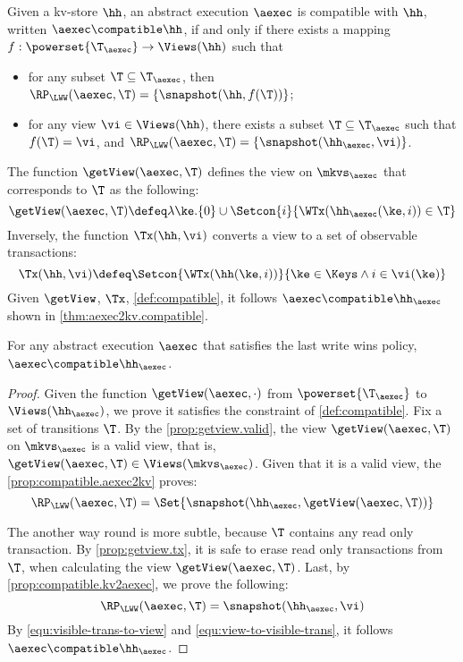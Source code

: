 \begin{definition}
\label{def:compatible}
Given a kv-store $\hh$,
an abstract execution $\aexec$ is compatible with $\hh$, written 
$\aexec \compatible \hh$, if and only if there exists a  mapping 
$f: \powerset{\T_{\aexec}} \rightarrow \Views(\hh)$
such that  
\begin{itemize}
\item for any subset $\T \subseteq \T_{\aexec}$, then $\RP_{\LWW}(\aexec, \T) = \{\snapshot(\hh, f(\T))\}$; 
\item for any view $\vi \in \Views(\hh)$, there exists a subset $\T \subseteq \T_{\aexec}$ 
such that $f(\T) = \vi$, and $\RP_{\LWW}(\aexec, \T) = \{\snapshot(\hh_{\aexec}, \vi)\}$.
\end{itemize}
\end{definition}

The function $\getView(\aexec, \T)$ defines the view on \( \mkvs_\aexec \) that corresponds to \( \T \) as the following:
\[
    \getView(\aexec, \T) \defeq \lambda \ke. \{0\} \cup \Setcon{ i }{\WTx(\hh_{\aexec}(\ke, i)) \in \T}
\]
Inversely, the function \( \Tx(\hh, \vi) \) converts a view to a set of observable transactions:
\[
\Tx(\hh, \vi) \defeq \Setcon{ \WTx(\hh(\ke, i)) }{ \ke \in \Keys \wedge i \in \vi(\ke) }
\]
Given \( \getView \), \( \Tx \), \cref{def:compatible}, 
it follows \( \aexec \compatible \hh_{\aexec} \) shown in \cref{thm:aexec2kv.compatible}.

\begin{theorem}
\label{thm:aexec2kv.compatible}
For any abstract execution $\aexec$ that satisfies the last write wins policy, $\aexec \compatible \hh_{\aexec}$.
\end{theorem}
\begin{proof}
Given the function $\getView(\aexec, \cdot )$ from $\powerset{\T_{\aexec}}$ to $\Views(\hh_{\aexec})$,
we prove it satisfies the constraint of \cref{def:compatible}.
Fix a set of transitions \( \T \).
By the \cref{prop:getview.valid}, the view $\getView(\aexec, \T )$  on \( \mkvs_\aexec \) is a valid view,
that is, \( \getView(\aexec, \T ) \in \Views(\mkvs_\aexec) \).
Given that it is a valid view, the \cref{prop:compatible.aexec2kv} proves:
\begin{equation}
    \label{equ:visible-trans-to-view}
    \RP_{\LWW}(\aexec, \T) = \Set{\snapshot(\hh_{\aexec}, \getView(\aexec, \T))} 
\end{equation}

The another way round is more subtle,
because \( \T \) contains any read only transaction.
By \cref{prop:getview.tx}, it is safe to erase read only transactions from \( \T \),
when calculating the view \( \getView(\aexec, \T ) \).
Last, by \cref{prop:compatible.kv2aexec}, we prove the following:
\begin{equation}
    \label{equ:view-to-visible-trans}
    \RP_{\LWW}(\aexec, \T) = \snapshot(\hh_{\aexec}, \vi)
\end{equation}
By \cref{equ:visible-trans-to-view} and \cref{equ:view-to-visible-trans},
it follows \( \aexec \compatible \hh_{\aexec} \).
\end{proof}

